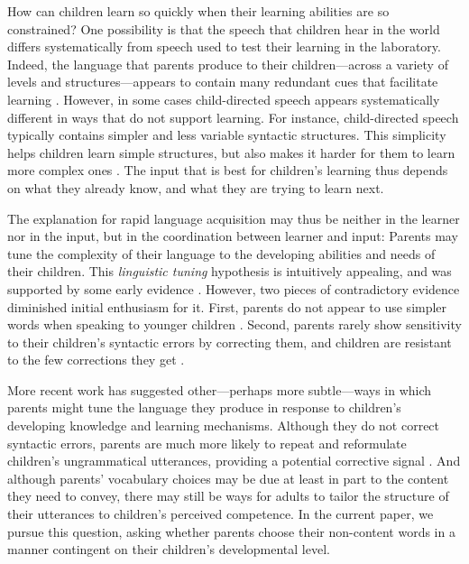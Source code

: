 \documentclass[10pt,letterpaper]{article}
\begin{document}
How can children learn so quickly when their learning abilities are so constrained? One possibility is that the speech that children hear in the world differs systematically from speech used to test their learning in the laboratory. Indeed, the language that parents produce to their children---across a variety of levels and structures---appears to contain many redundant cues that facilitate learning \cite{gogate2000, thiessen2005, yurovsky2012}. However, in some cases child-directed speech appears systematically different in ways that do not support learning. For instance, child-directed speech typically contains simpler and less variable syntactic structures. This simplicity helps children learn simple structures, but also makes it harder for them to learn more complex ones \cite{montag2015a, montag2015b}. The input that is best for children's learning thus depends on what they already know, and what they are trying to learn next.

The explanation for rapid language acquisition may thus be neither in the learner nor in the input, but in the coordination between learner and input: Parents may tune the complexity of their language to the developing abilities and needs of their children. This \emph{linguistic tuning} hypothesis is intuitively appealing, and was supported by some early evidence \cite{snow1972}. However, two pieces of contradictory evidence diminished initial enthusiasm for it. First, parents do not appear to use simpler words when speaking to younger children \cite{hayes1988}. Second, parents rarely show sensitivity to their children's syntactic errors by correcting them, and children are resistant to the few corrections they get \cite{brown1970, newport1977}.

More recent work has suggested other---perhaps more subtle---ways in which parents might tune the language they produce in response to children's developing knowledge and learning mechanisms. Although they do not correct syntactic errors, parents are much more likely to repeat and reformulate children's ungrammatical utterances, providing a potential corrective signal \cite{hirsh-pasek1984, chouinard2003}. And although parents' vocabulary choices may be due at least in part to the content they need to convey, there may still be ways for adults to tailor the structure of their utterances to children's perceived competence. In the current paper, we pursue this question, asking whether parents choose their non-content words in a manner contingent on their children's developmental level.
\end{document}
